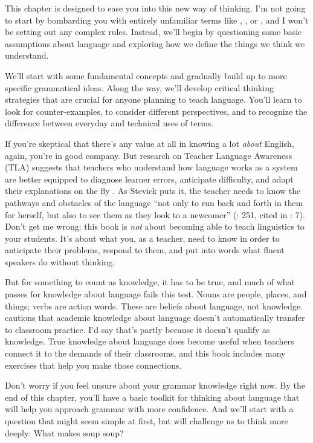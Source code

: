 This chapter is designed to ease you into this new way of thinking. I'm not going to start by bombarding you with entirely unfamiliar terms like , , or , and I won't be setting out any complex rules. Instead, we'll begin by questioning some basic assumptions about language and exploring how we define the things we think we understand.

We'll start with some fundamental concepts and gradually build up to more specific grammatical ideas. Along the way, we'll develop critical thinking strategies that are crucial for anyone planning to teach language. You'll learn to look for counter-examples, to consider different perspectives, and to recognize the difference between everyday and technical uses of terms.

If you're skeptical that there's any value at all in knowing a lot \emph{about} English, again, you're in good company. But research on Teacher Language Awareness (TLA) suggests that teachers who understand how language works as a system are better equipped to diagnose learner errors, anticipate difficulty, and adapt their explanations on the fly \autocite{Andrews2007}. As Stevick puts it, the teacher needs to know the pathways and obstacles of the language \enquote{not only to run back and forth in them for herself, but also to see them as they look to a newcomer} (\citeyear{Stevick1980}: 251, cited in \citealt{Andrews2007}: 7). Don't get me wrong: this book is \emph{not} about becoming able to teach linguistics to your students. It's about what you, as a teacher, need to know in order to anticipate their problems, respond to them, and put into words what fluent speakers do without thinking.

But for something to count as knowledge, it has to be true, and much of what passes for knowledge about language fails this test. Nouns are people, places, and things; verbs are action words. These are beliefs about language, not knowledge. \textcite{Bartels2009} cautions that academic knowledge about language doesn't automatically transfer to classroom practice. I'd say that's partly because it doesn't qualify as knowledge. True knowledge about language does become useful when teachers connect it to the demands of their classrooms, and this book includes many exercises that help you make those connections.

Don't worry if you feel unsure about your grammar knowledge right now. By the end of this chapter, you'll have a basic toolkit for thinking about language that will help you approach grammar with more confidence. And we'll start with a question that might seem simple at first, but will challenge us to think more deeply: What makes soup soup?


